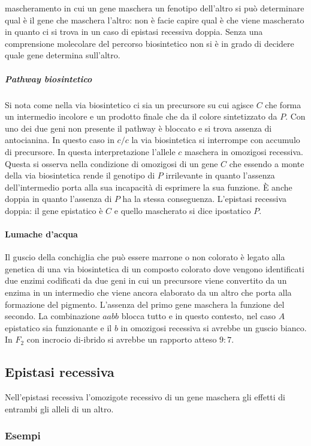 mascheramento in cui un gene maschera un fenotipo dell'altro si pu\`o determinare qual \`e il gene che maschera l'altro: non \`e facie capire qual \`e che viene mascherato in quanto 
ci si trova in un caso di epistasi recessiva doppia. Senza una comprensione molecolare del percorso biosintetico non si \`e in grado di decidere quale gene determina sull'altro. 
\subparagraph{Pathway biosintetico}
Si nota come nella via biosintetico ci sia un precursore su cui agisce $C$ che forma un intermedio incolore e un prodotto finale che da il colore sintetizzato da $P$. Con uno dei
due geni non presente il pathway \`e bloccato e si trova assenza di antocianina. In questo caso in $c/c$ la via biosintetica si interrompe con accumulo di precursore. In questa 
interpretazione l'allele $c$ maschera in omozigosi recessiva. Questa si osserva nella condizione di omozigosi di un gene $C$ che essendo a monte della via biosintetica rende il 
genotipo di $P$ irrilevante in quanto l'assenza dell'intermedio porta alla sua incapacit\`a di esprimere la sua funzione. \`E anche doppia in quanto l'assenza di $P$ ha la stessa
conseguenza. L'epistasi recessiva doppia: il gene epistatico \`e $C$ e quello mascherato si dice ipostatico $P$. 
\paragraph{Lumache d'acqua}
Il guscio della conchiglia che pu\`o essere marrone o non colorato \`e legato alla genetica di una via biosintetica di un composto colorato dove vengono identificati due enzimi 
codificati da due geni in cui un precursore viene convertito da un enzima in un intermedio che viene ancora elaborato da un altro che porta alla formazione del pigmento. L'assenza 
del primo gene maschera la funzione del secondo. La combinazione $aabb$ blocca tutto e in questo contesto, nel caso $A$ epistatico sia funzionante e il $b$ in omozigosi 
recessiva si avrebbe un guscio bianco. In $F_2$ con incrocio di-ibrido si avrebbe un rapporto atteso $9:7$.


\subsection{Epistasi recessiva} 
Nell'epistasi recessiva l'omozigote recessivo di un gene maschera gli effetti di entrambi gli alleli di un altro.
\subsubsection{Esempi}
